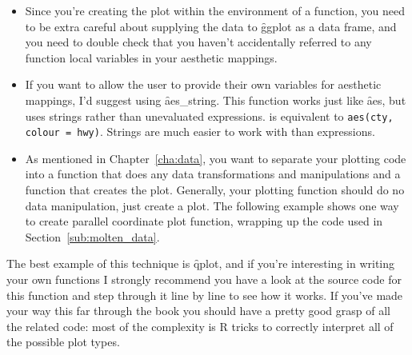 \begin{itemize}
  \item Since you're creating the plot within the environment of a function, you need to be extra careful about supplying the data to \f{ggplot} as a data frame, and you need to double check that you haven't accidentally referred to any function local variables in your aesthetic mappings.

  \item If you want to allow the user to provide their own variables for aesthetic mappings, I'd suggest using \f{aes_string}.  This function works just like \f{aes}, but uses strings rather than unevaluated expressions.  is equivalent to {\tt aes(cty, colour = hwy)}.  Strings are much easier to work with than expressions.  

  \item As mentioned in Chapter~\ref{cha:data}, you want to separate your plotting code into a function that does any data transformations and manipulations and a function that creates the plot. Generally, your plotting function should do no data manipulation, just create a plot. The following example shows one way to create parallel coordinate plot function, wrapping up the code used in Section~\ref{sub:molten_data}. 

    
  
\end{itemize}

The best example of this technique is \f{qplot}, and if you're interesting in writing your own functions I strongly recommend you have a look at the source code for this function and step through it line by line to see how it works.  If you've made your way this far through the book you should have a pretty good grasp of all the \ggplot related code: most of the complexity is R tricks to correctly interpret all of the possible plot types.





